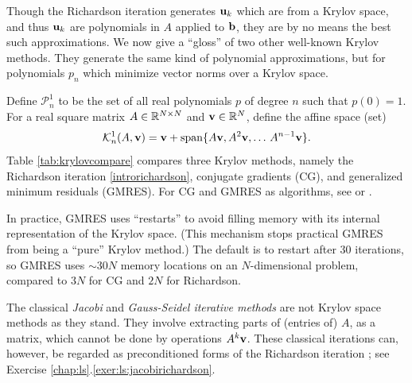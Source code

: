 Though the Richardson iteration generates $\mathbf{u}_k$ which are from a Krylov space, and thus $\mathbf{u}_k$ are polynomials in $A$ applied to $\mathbf{b}$, they are by no means the best such approximations.  We now give a ``gloss'' of two other well-known Krylov methods.  They generate the same kind of polynomial approximations, but for polynomials $p_n$ which minimize vector norms over a Krylov space.

\newcommand{\Pnone}{\mathcal{P}_n^1}
\newcommand{\Kone}[2]{\mathcal{K}_{#1}^1(#2)}
Define $\Pnone$ to be the set of all real polynomials $p$ of degree $n$ such that $p(0)=1$.  For a real square matrix $A \in \mathbb{R}^{N\times N}$ and $\mathbf{v}\in\mathbb{R}^N$, define the affine space (set)
\begin{equation}
\Kone{n}{A,\bv} = \bv + \Span\{A\bv,A^2\bv,\dots\,A^{n-1}\bv\}.
\end{equation}
Table \ref{tab:krylovcompare} compares three Krylov methods, namely the Richardson iteration \eqref{introrichardson}, conjugate gradients (CG), and generalized minimum residuals (GMRES).  For CG and GMRES as algorithms, see \citet{Greenbaum1997} or \citet{Saad2003}.

In practice, GMRES uses ``restarts'' to avoid filling memory with its internal representation of the Krylov space.  (This mechanism stops practical GMRES from being a ``pure'' Krylov method.)  The \PETSc default is to restart after 30 iterations, so GMRES uses $\sim 30N$ memory locations on an $N$-dimensional problem, compared to $3N$ for CG and $2N$ for Richardson.

The classical \emph{Jacobi} and \emph{Gauss-Seidel iterative methods} \citep{Greenbaum1997} are not Krylov space methods as they stand.  They involve extracting parts of (entries of) $A$, as a matrix, which cannot be done by operations $A^k\mathbf{v}$.  These classical iterations can, however, be regarded as preconditioned forms of the Richardson iteration \citep{Greenbaum1997}; see Exercise \ref{chap:ls}.\ref{exer:ls:jacobirichardson}.

